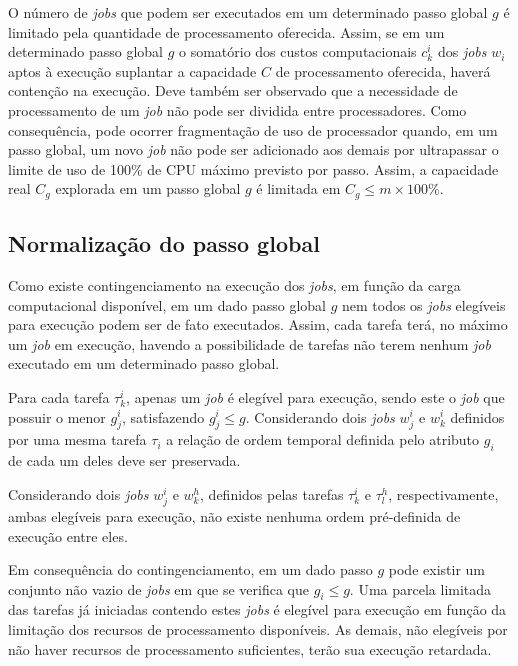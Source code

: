 \documentclass[tese,capa]{texufpel}
\begin{document}
O número de \textit{jobs} que podem ser executados em um determinado passo global $g$ é limitado pela quantidade de processamento oferecida. Assim, se em um determinado passo global $g$ o somatório dos custos computacionais $c_k^i$ dos \textit{jobs} $w_i$ aptos à execução suplantar a capacidade $C$ de processamento oferecida, haverá contenção na execução. Deve também ser observado que a necessidade de processamento de um \textit{job} não pode ser dividida entre processadores. Como consequência, pode ocorrer fragmentação de uso de processador quando, em um passo global, um novo \textit{job} não pode ser adicionado aos demais por ultrapassar o limite de uso de 100\% de CPU máximo previsto por passo. Assim, a capacidade real $C_g$ explorada em um passo global $g$ é limitada em $C_g \le m\times 100\%$.

\subsection{Normalização do passo global}\label{subsec:normalizacao_do_passo_global}

Como existe contingenciamento na execução dos \textit{jobs}, em função da carga computacional disponível, em um dado passo global $g$ nem todos os \textit{jobs} elegíveis para execução podem ser de fato executados. Assim, cada tarefa terá, no máximo um \textit{job} em execução, havendo a possibilidade de tarefas não terem nenhum \textit{job} executado em um determinado passo global.

Para cada tarefa $\tau^i_k$, apenas um \textit{job} é elegível para execução, sendo este o \textit{job} que possuir o menor $g_j^i$, satisfazendo $g_j^i \le g$. Considerando dois \textit{jobs} $w_j^i$ e $w_k^i$ definidos por uma mesma tarefa $\tau_i$ a relação de ordem temporal definida pelo atributo $g_i$ de cada um deles deve ser preservada.

Considerando dois \textit{jobs} $w_j^i$ e $w_k^h$, definidos pelas tarefas $\tau^i_k$ e $\tau^h_l$, respectivamente, ambas elegíveis para execução, não existe nenhuma ordem pré-definida de execução entre eles.

Em consequência do contingenciamento, em um dado passo $g$ pode existir um conjunto não vazio de \textit{jobs} em que se verifica que $g_i \le g$. Uma parcela limitada das tarefas já iniciadas contendo estes \textit{jobs} é elegível para execução em função da limitação dos recursos de processamento disponíveis. As demais, não elegíveis por não haver recursos de processamento suficientes, terão sua execução retardada.
\end{document}
